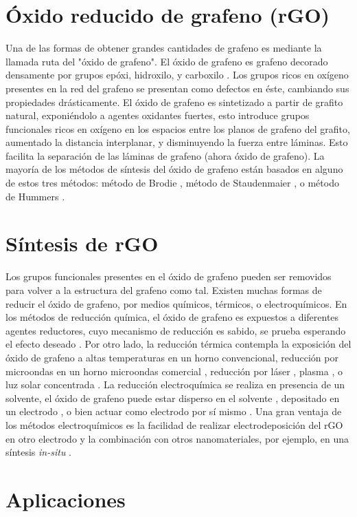 \section{Óxido reducido de grafeno (rGO)}
Una de las formas de obtener grandes cantidades de grafeno es mediante la llamada ruta del "óxido de grafeno". El óxido de grafeno es grafeno decorado densamente por grupos epóxi, hidroxilo, y carboxilo \citep{Dreyer2010}. Los grupos ricos en oxígeno presentes en la red del grafeno se presentan como defectos en éste, cambiando sus propiedades drásticamente.
El óxido de grafeno es sintetizado a partir de grafito natural, exponiéndolo a agentes oxidantes fuertes, esto introduce grupos funcionales ricos en oxígeno en los espacios entre los planos de grafeno del grafito, aumentado la distancia interplanar, y disminuyendo la fuerza entre láminas. Esto facilita la separación de las láminas de grafeno (ahora óxido de grafeno). La mayoría de los métodos de síntesis del óxido de grafeno están basados en alguno de estos tres métodos: método de Brodie \citep{Brodie1859}, método de Staudenmaier \citep{Staudenmaier1898}, o método de Hummers \citep{Hummers1958}.



\section{Síntesis de rGO}
Los grupos funcionales presentes en el óxido de grafeno pueden ser removidos para volver a la estructura del grafeno como tal. Existen muchas formas de reducir el óxido de grafeno, por medios químicos, térmicos, o electroquímicos. En los métodos de reducción química, el óxido de grafeno es expuestos a diferentes agentes reductores, cuyo mecanismo de reducción es sabido, se prueba esperando el efecto deseado \citep{Chua2015}. Por otro lado, la reducción térmica contempla la exposición del óxido de grafeno a altas temperaturas en un horno convencional, reducción por microondas en un horno microondas comercial \citep{Zhu2010a}, reducción por láser \citep{El-Kady2013}, plasma \citep{Lee2012}, o luz solar concentrada \citep{Mohandoss2017}. La reducción electroquímica se realiza en presencia de un solvente, el óxido de grafeno puede estar disperso en el solvente \citep{Liu2011}, depositado en un electrodo \citep{Harima2011, Toh2014}, o bien actuar como electrodo por sí mismo \citep{Feng2016}. Una gran ventaja de los métodos electroquímicos es la facilidad de realizar electrodeposición del rGO en otro electrodo y la combinación con otros nanomateriales, por ejemplo, en una síntesis \emph{in-situ} \citep{Liu2011, Xie2014}.

\section{Aplicaciones}